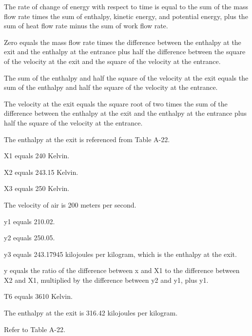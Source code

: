 The rate of change of energy with respect to time is equal to the sum of the mass flow rate times the sum of enthalpy, kinetic energy, and potential energy, plus the sum of heat flow rate minus the sum of work flow rate.

Zero equals the mass flow rate times the difference between the enthalpy at the exit and the enthalpy at the entrance plus half the difference between the square of the velocity at the exit and the square of the velocity at the entrance.

The sum of the enthalpy and half the square of the velocity at the exit equals the sum of the enthalpy and half the square of the velocity at the entrance.

The velocity at the exit equals the square root of two times the sum of the difference between the enthalpy at the exit and the enthalpy at the entrance plus half the square of the velocity at the entrance.

The enthalpy at the exit is referenced from Table A-22.

X1 equals 240 Kelvin.

X2 equals 243.15 Kelvin.

X3 equals 250 Kelvin.

The velocity of air is 200 meters per second.

y1 equals 210.02.

y2 equals 250.05.

y3 equals 243.17945 kilojoules per kilogram, which is the enthalpy at the exit.

y equals the ratio of the difference between x and X1 to the difference between X2 and X1, multiplied by the difference between y2 and y1, plus y1.

T6 equals 3610 Kelvin.

The enthalpy at the exit is 316.42 kilojoules per kilogram.

Refer to Table A-22.
